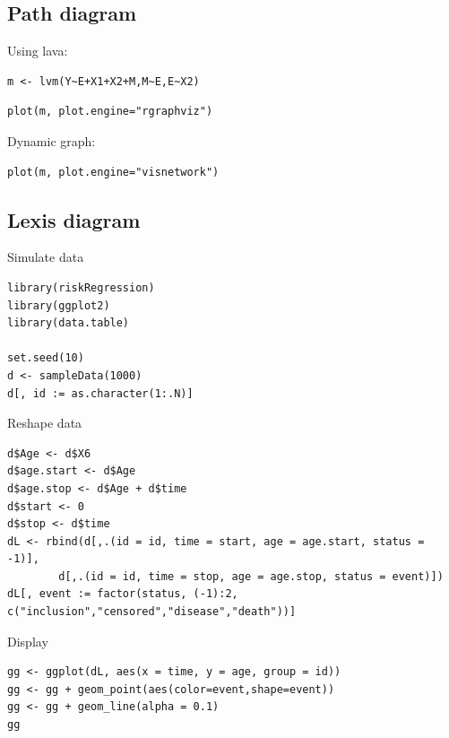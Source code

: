 \documentclass{article}
\begin{document}
\subsection{Path diagram}
\label{sec:org6ee633a}
Using lava:
\lstset{language=r,label= ,caption= ,captionpos=b,numbers=none}
\begin{lstlisting}
m <- lvm(Y~E+X1+X2+M,M~E,E~X2)
\end{lstlisting}

\lstset{language=r,label= ,caption= ,captionpos=b,numbers=none}
\begin{lstlisting}
plot(m, plot.engine="rgraphviz")
\end{lstlisting}

Dynamic graph:
\lstset{language=r,label= ,caption= ,captionpos=b,numbers=none}
\begin{lstlisting}
plot(m, plot.engine="visnetwork")
\end{lstlisting}
\subsection{Lexis diagram}
\label{sec:org85c6748}

Simulate data
\lstset{language=r,label= ,caption= ,captionpos=b,numbers=none}
\begin{lstlisting}
library(riskRegression)
library(ggplot2)
library(data.table)

set.seed(10)
d <- sampleData(1000)
d[, id := as.character(1:.N)]
\end{lstlisting}

Reshape data
\lstset{language=r,label= ,caption= ,captionpos=b,numbers=none}
\begin{lstlisting}
d$Age <- d$X6
d$age.start <- d$Age
d$age.stop <- d$Age + d$time
d$start <- 0
d$stop <- d$time
dL <- rbind(d[,.(id = id, time = start, age = age.start, status = -1)],
	    d[,.(id = id, time = stop, age = age.stop, status = event)])
dL[, event := factor(status, (-1):2, c("inclusion","censored","disease","death"))]
\end{lstlisting}
Display
\lstset{language=r,label= ,caption= ,captionpos=b,numbers=none}
\begin{lstlisting}
gg <- ggplot(dL, aes(x = time, y = age, group = id))
gg <- gg + geom_point(aes(color=event,shape=event)) 
gg <- gg + geom_line(alpha = 0.1) 
gg
\end{lstlisting}
\end{document}
